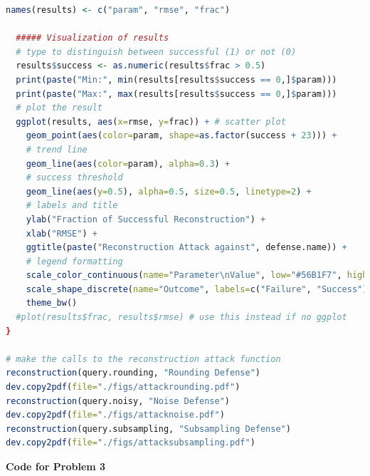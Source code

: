 \documentclass[12pt]{article}
\begin{document}
\begin{lstlisting}[language=R]
  names(results) <- c("param", "rmse", "frac")
  
  ##### Visualization of results
  # type to distinguish between successful (1) or not (0)
  results$success <- as.numeric(results$frac > 0.5)
  print(paste("Min:", min(results[results$success == 0,]$param)))
  print(paste("Max:", max(results[results$success == 0,]$param)))
  # plot the result
  ggplot(results, aes(x=rmse, y=frac)) + # scatter plot
    geom_point(aes(color=param, shape=as.factor(success + 23))) + 
    # trend line
    geom_line(aes(color=param), alpha=0.3) +
    # success threshold
    geom_line(aes(y=0.5), alpha=0.5, size=0.5, linetype=2) +
    # labels and title
    ylab("Fraction of Successful Reconstruction") +
    xlab("RMSE") +
    ggtitle(paste("Reconstruction Attack against", defense.name)) + 
    # legend formatting
    scale_color_continuous(name="Parameter\nValue", low="#56B1F7", high="#132B43") +
    scale_shape_discrete(name="Outcome", labels=c("Failure", "Success")) +
    theme_bw()
  #plot(results$frac, results$rmse) # use this instead if no ggplot
}

# make the calls to the reconstruction attack function
reconstruction(query.rounding, "Rounding Defense")
dev.copy2pdf(file="./figs/attackrounding.pdf")
reconstruction(query.noisy, "Noise Defense")
dev.copy2pdf(file="./figs/attacknoise.pdf")
reconstruction(query.subsampling, "Subsampling Defense")
dev.copy2pdf(file="./figs/attacksubsampling.pdf")
\end{lstlisting}


\pagebreak

\textbf{Code for Problem 3}
\end{document}
